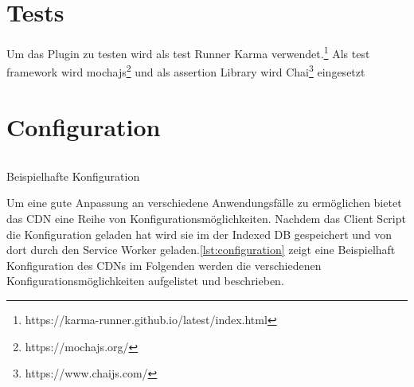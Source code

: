 \begin{description}


\section{Tests}
Um das Plugin zu testen wird als test Runner Karma verwendet.\footnote{https://karma-runner.github.io/latest/index.html} Als test framework wird mochajs\footnote{https://mochajs.org/} und als assertion Library wird Chai\footnote{https://www.chaijs.com/} eingesetzt 



\section{Configuration}
\begin{listing}[h]
	\inputminted{javascript}{listings/configuration.js}
	\caption{Beispielhafte Konfiguration}
	\label{lst:configuration}
\end{listing}

Um eine gute Anpassung an verschiedene Anwendungsfälle zu ermöglichen bietet das \pTp CDN eine Reihe von Konfigurationsmöglichkeiten. Nachdem das Client Script die Konfiguration geladen hat wird sie im der Indexed DB gespeichert und von dort durch den Service Worker geladen.\ref{lst:configuration} zeigt eine Beispielhaft Konfiguration des CDNs im Folgenden werden die verschiedenen Konfigurationsmöglichkeiten aufgelistet und beschrieben.


\end{description}
